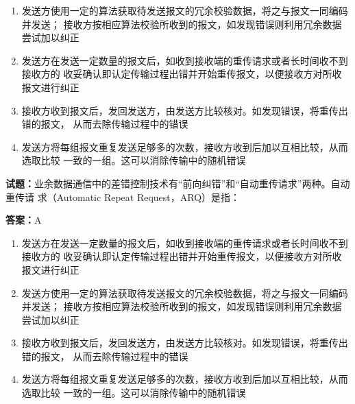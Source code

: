 \documentclass{ctexbook}
\begin{document}
\begin{enumerate}[leftmargin=3em]
  \item 发送方使用一定的算法获取待发送报文的冗余校验数据，将之与报文一同编码并发送；
接收方按相应算法校验所收到的报文，如发现错误则利用冗余数据尝试加以纠正 

  \item 发送方在发送一定数量的报文后，如收到接收端的重传请求或者长时间收不到接收方的
收妥确认即认定传输过程出错并开始重传报文，以便接收方对所收报文进行纠正 

  \item 接收方收到报文后，发回发送方，由发送方比较核对。如发现错误，将重传出错的报文，
从而去除传输过程中的错误 

  \item 发送方将每组报文重复发送足够多的次数，接收方收到后加以互相比较，从而选取比较
一致的一组。这可以消除传输中的随机错误 

\end{enumerate}






\vspace{1em}

\textbf{试题：}业余数据通信中的差错控制技术有“前向纠错”和“自动重传请求”两种。自动重传请
求（Automatic Repeat Request，ARQ）是指： 

\textbf{答案：}A 

\begin{enumerate}[leftmargin=3em]
  \item 发送方在发送一定数量的报文后，如收到接收端的重传请求或者长时间收不到接收方的
收妥确认即认定传输过程出错并开始重传报文，以便接收方对所收报文进行纠正 

  \item 发送方使用一定的算法获取待发送报文的冗余校验数据，将之与报文一同编码并发送；
接收方按相应算法校验所收到的报文，如发现错误则利用冗余数据尝试加以纠正 

  \item 接收方收到报文后，发回发送方，由发送方比较核对。如发现错误，将重传出错的报文，
从而去除传输过程中的错误 

  \item 发送方将每组报文重复发送足够多的次数，接收方收到后加以互相比较，从而选取比较
一致的一组。这可以消除传输中的随机错误 

\end{enumerate}
\end{document}
